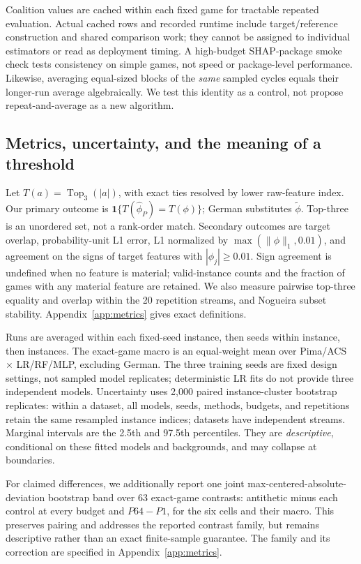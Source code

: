 \documentclass{article}
\newcommand{\Top}{\operatorname{Top}_3}
\newcommand{\ind}{\mathbf{1}}
\begin{document}
Coalition values are cached within each fixed game for tractable repeated evaluation. Actual cached rows and recorded runtime include target/reference construction and shared comparison work; they cannot be assigned to individual estimators or read as deployment timing. A high-budget SHAP-package smoke check tests consistency on simple games, not speed or package-level performance. Likewise, averaging equal-sized blocks of the \emph{same} sampled cycles equals their longer-run average algebraically. We test this identity as a control, not propose repeat-and-average as a new algorithm.

\subsection{Metrics, uncertainty, and the meaning of a threshold}
Let $T(a)=\Top(|a|)$, with exact ties resolved by lower raw-feature index. Our primary outcome is $\ind\{T(\widehat\phi_P)=T(\phi)\}$; German substitutes $\widetilde\phi$. Top-three is an unordered set, not a rank-order match. Secondary outcomes are target overlap, probability-unit L1 error, L1 normalized by $\max(\|\phi\|_1,0.01)$, and agreement on the signs of target features with $|\phi_j|\geq0.01$. Sign agreement is undefined when no feature is material; valid-instance counts and the fraction of games with any material feature are retained. We also measure pairwise top-three equality and overlap within the 20 repetition streams, and Nogueira subset stability. Appendix~\ref{app:metrics} gives exact definitions.

Runs are averaged within each fixed-seed instance, then seeds within instance, then instances. The exact-game macro is an equal-weight mean over Pima/ACS $\times$ LR/RF/MLP, excluding German. The three training seeds are fixed design settings, not sampled model replicates; deterministic LR fits do not provide three independent models. Uncertainty uses 2,000 paired instance-cluster bootstrap replicates: within a dataset, all models, seeds, methods, budgets, and repetitions retain the same resampled instance indices; datasets have independent streams. Marginal intervals are the 2.5th and 97.5th percentiles. They are \emph{descriptive}, conditional on these fitted models and backgrounds, and may collapse at boundaries.

For claimed differences, we additionally report one joint max-centered-absolute-deviation bootstrap band over 63 exact-game contrasts: antithetic minus each control at every budget and $P64-P1$, for the six cells and their macro. This preserves pairing and addresses the reported contrast family, but remains descriptive rather than an exact finite-sample guarantee. The family and its correction are specified in Appendix~\ref{app:metrics}.
\end{document}
